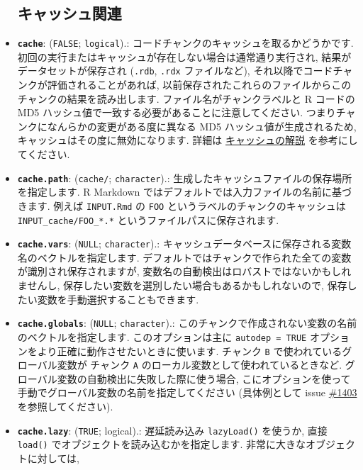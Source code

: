 \documentclass[
  xelatex,ja=standard,jafont=noto]{bxjsreport}
\begin{document}
\begin{itemize}
{  \subsection{キャッシュ関連}\label{options-cache}}
\item
  \textbf{\texttt{cache}}: (\texttt{FALSE}; \texttt{logical}).:
  コードチャンクのキャッシュを取るかどうかです.
  初回の実行またはキャッシュが存在しない場合は通常通り実行され,
  結果がデータセットが保存され (\texttt{.rdb}, \texttt{.rdx}
  ファイルなど), それ以降でコードチャンクが評価されることがあれば,
  以前保存されたこれらのファイルからこのチャンクの結果を読み出します.
  ファイル名がチャンクラベルと R コードの MD5
  ハッシュ値で一致する必要があることに注意してください.
  つまりチャンクになんらかの変更がある度に異なる MD5
  ハッシュ値が生成されるため, キャッシュはその度に無効になります. 詳細は
  \protect\hyperlink{cache}{キャッシュの解説} を参考にしてください.
\item
  \textbf{\texttt{cache.path}}:
  (\texttt{\textquotesingle{}cache/\textquotesingle{}};
  \texttt{character}).:
  生成したキャッシュファイルの保存場所を指定します. R Markdown
  ではデフォルトでは入力ファイルの名前に基づきます. 例えば
  \texttt{INPUT.Rmd} の \texttt{FOO}
  というラベルのチャンクのキャッシュは \texttt{INPUT\_cache/FOO\_*.*}
  というファイルパスに保存されます.
\item
  \textbf{\texttt{cache.vars}}: (\texttt{NULL}; \texttt{character}).:
  キャッシュデータベースに保存される変数名のベクトルを指定します.
  デフォルトではチャンクで作られた全ての変数が識別され保存されますが,
  変数名の自動検出はロバストではないかもしれませんし,
  保存したい変数を選別したい場合もあるかもしれないので,
  保存したい変数を手動選択することもできます.
\item
  \textbf{\texttt{cache.globals}}: (\texttt{NULL}; \texttt{character}).:
  このチャンクで作成されない変数の名前のベクトルを指定します.
  このオプションは主に \texttt{autodep\ =\ TRUE}
  オプションをより正確に動作させたいときに使います. チャンク \texttt{B}
  で使われているグローバル変数が チャンク \texttt{A}
  のローカル変数として使われているときなど.
  グローバル変数の自動検出に失敗した際に使う場合,
  こにオプションを使って手動でグローバル変数の名前を指定してください
  (具体例として issue
  \href{https://github.com/yihui/knitr/issues/1403}{\#1403}
  を参照してください).
\item
  \textbf{\texttt{cache.lazy}}: (\texttt{TRUE}; logical).: 遅延読み込み
  \texttt{lazyLoad()} を使うか, 直接 \texttt{load()}
  でオブジェクトを読み込むかを指定します.
  非常に大きなオブジェクトに対しては,

\end{itemize}
\end{document}

